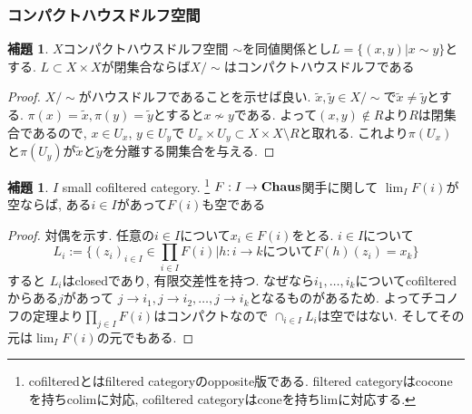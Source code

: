 \documentclass[dvipdfmx,a4paper,11pt]{report}
\theoremstyle{definition}
\newtheorem{lem}[thm]{補題}
\begin{document}
\subsubsection{コンパクトハウスドルフ空間}

 \begin{tcolorbox}
 [colback = white, colframe = green!35!black, fonttitle = \bfseries,breakable = true]
\begin{lem}
\label{lem-CHaus-relation}
$X$コンパクトハウスドルフ空間
$\sim$を同値関係とし$L = \{ (x,y) | x \sim y\}$とする.
$L \subset X \times X$が閉集合ならば$X/\sim$はコンパクトハウスドルフである
\end{lem}
\end{tcolorbox}

\begin{proof}
$X / \sim$がハウスドルフであることを示せば良い.
$\tilde{x}, \tilde{y} \in X/ \sim$で$\tilde{x} \neq \tilde{y}$とする.
$\pi(x) = \tilde{x}, \pi(y) = \tilde{y}$とすると$x \not \sim y$である.
よって$(x,y) \not \in R$より$R$は閉集合であるので, $x \in U_x$, $y \in U_y$で
$U_x \times U_y \subset X \times X \setminus R$と取れる.
これより$\pi(U_x)$と$\pi(U_y)$が$\tilde{x}$と$\tilde{y}$を分離する開集合を与える. 
\end{proof}


   \begin{tcolorbox}
 [colback = white, colframe = green!35!black, fonttitle = \bfseries,breakable = true]
\begin{lem}
\label{lem-cpthaus}
$I$ small cofiltered category. \footnote{cofilteredとはfiltered categoryのopposite版である. filtered categoryはcoconeを持ちcolimに対応, cofiltered categoryはconeを持ちlimに対応する.}
$F :  I \to {\bf Chaus}$関手に関して
$\lim_{I}F(i)$が空ならば, ある$i \in I$があって$F(i)$も空である
\end{lem}
\end{tcolorbox}
\begin{proof}
対偶を示す. 
任意の$i \in I$について$x_i \in F(i)$をとる. 
$i \in I$について
$$
L_i := \{(z_i)_{i \in I} \in \prod_{i \in I}F(i) | \text{$h : i \to k$について$F(h)(z_i) = x_k$}\}
$$
すると
$L_i$はclosedであり, 有限交差性を持つ.
なぜなら$i_1, \ldots, i_k$についてcofilteredからある$j$があって
$j \to i_1, j\to i_2, \ldots , j\to i_k$となるものがあるため. 
よってチコノフの定理より$\prod_{j \in I}F(i) $はコンパクトなので
$\cap_{i \in I} L_i$は空ではない.
そしてその元は$\lim_{I}F(i)$の元でもある.
\end{proof}
\end{document}
